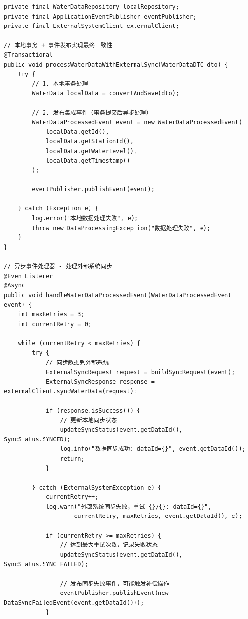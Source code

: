 \begin{verbatim}
private final WaterDataRepository localRepository;
private final ApplicationEventPublisher eventPublisher;
private final ExternalSystemClient externalClient;

// 本地事务 + 事件发布实现最终一致性
@Transactional
public void processWaterDataWithExternalSync(WaterDataDTO dto) {
    try {
        // 1. 本地事务处理
        WaterData localData = convertAndSave(dto);
        
        // 2. 发布集成事件（事务提交后异步处理）
        WaterDataProcessedEvent event = new WaterDataProcessedEvent(
            localData.getId(), 
            localData.getStationId(),
            localData.getWaterLevel(),
            localData.getTimestamp()
        );
        
        eventPublisher.publishEvent(event);
        
    } catch (Exception e) {
        log.error("本地数据处理失败", e);
        throw new DataProcessingException("数据处理失败", e);
    }
}

// 异步事件处理器 - 处理外部系统同步
@EventListener
@Async
public void handleWaterDataProcessedEvent(WaterDataProcessedEvent event) {
    int maxRetries = 3;
    int currentRetry = 0;
    
    while (currentRetry < maxRetries) {
        try {
            // 同步数据到外部系统
            ExternalSyncRequest request = buildSyncRequest(event);
            ExternalSyncResponse response = externalClient.syncWaterData(request);
            
            if (response.isSuccess()) {
                // 更新本地同步状态
                updateSyncStatus(event.getDataId(), SyncStatus.SYNCED);
                log.info("数据同步成功: dataId={}", event.getDataId());
                return;
            }
            
        } catch (ExternalSystemException e) {
            currentRetry++;
            log.warn("外部系统同步失败，重试 {}/{}: dataId={}", 
                    currentRetry, maxRetries, event.getDataId(), e);
            
            if (currentRetry >= maxRetries) {
                // 达到最大重试次数，记录失败状态
                updateSyncStatus(event.getDataId(), SyncStatus.SYNC_FAILED);
                
                // 发布同步失败事件，可能触发补偿操作
                eventPublisher.publishEvent(new DataSyncFailedEvent(event.getDataId()));
            }
            

\end{verbatim}
